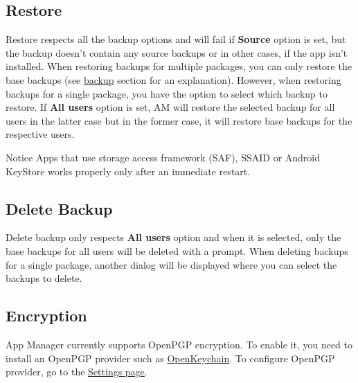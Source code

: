 \subsection{Restore}\label{subsec:backup-restore-restore}
Restore respects all the backup options and will fail if \textbf{Source} option is set, but the backup doesn't contain
any source backups or in other cases, if the app isn't installed. When restoring backups for multiple packages, you can
only restore the base backups (see \hyperref[subsec:backup-restore-backup]{backup} section for an explanation). However,
when restoring backups for a single package, you have the option to select which backup to restore. If
\textbf{All users} option is set, AM will restore the selected backup for all users in the latter case but in the former
case, it will restore base backups for the respective users.

\begin{tip}{Notice}
    Apps that use storage access framework (SAF), SSAID or Android KeyStore works properly only after an immediate restart.
\end{tip}

\subsection{Delete Backup}\label{subsec:backup-restore-delete-backup}
Delete backup only respects \textbf{All users} option and when it is selected, only the base backups for all users will
be deleted with a prompt. When deleting backups for a single package, another dialog will be displayed where you can
select the backups to delete.

\subsection{Encryption}\label{subsec:backup-restore-encryption}
App Manager currently supports OpenPGP encryption. To enable it, you need to install an OpenPGP provider such as
\href{https://openkeychain.org}{OpenKeychain}. To configure OpenPGP provider, go to the
\hyperref[subsubsec:settings-encryption]{Settings page}.
